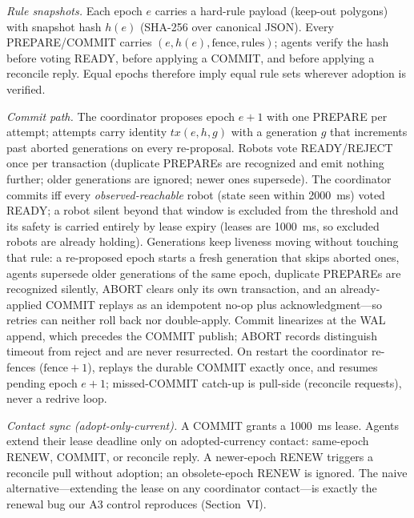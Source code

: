 \documentclass[10pt,journal]{IEEEtran}
\begin{document}
\emph{Rule snapshots.} Each epoch $e$ carries a hard-rule payload
(keep-out polygons) with snapshot hash $h(e)$ (SHA-256 over canonical
JSON). Every PREPARE/COMMIT carries $(e,h(e),\text{fence},\text{rules})$;
agents verify the hash before voting READY, before applying a COMMIT,
and before applying a reconcile reply. Equal epochs therefore imply
equal rule sets wherever adoption is verified.

\emph{Commit path.} The coordinator proposes epoch $e{+}1$ with one
PREPARE per attempt; attempts carry identity
$\mathit{tx}(e,h,g)$ with a generation $g$ that increments past
aborted generations on every re-proposal. Robots vote READY/REJECT
once per transaction (duplicate PREPAREs are recognized and emit
nothing further; older generations are ignored; newer ones supersede).
The coordinator commits iff every \emph{observed-reachable} robot
(state seen within 2000~ms) voted READY; a robot silent beyond that
window is excluded from the threshold and its safety is carried
entirely by lease expiry (leases are 1000~ms, so excluded robots are
already holding). Generations keep liveness moving without touching
that rule: a re-proposed epoch starts a fresh generation that skips
aborted ones, agents supersede older generations of the same epoch,
duplicate PREPAREs are recognized silently, ABORT clears only its own
transaction, and an already-applied COMMIT replays as an idempotent
no-op plus acknowledgment---so retries can neither roll back nor
double-apply. Commit linearizes at the WAL append, which precedes
the COMMIT publish; ABORT records distinguish timeout from reject and
are never resurrected. On restart the coordinator re-fences
($\text{fence}+1$), replays the durable COMMIT exactly once, and
resumes pending epoch $e{+}1$; missed-COMMIT catch-up is pull-side
(reconcile requests), never a redrive loop.

\emph{Contact sync (adopt-only-current).} A COMMIT grants a 1000~ms
lease. Agents extend their lease deadline only on adopted-currency
contact: same-epoch RENEW, COMMIT, or reconcile reply. A newer-epoch
RENEW triggers a reconcile pull without adoption; an obsolete-epoch
RENEW is ignored. The naive alternative---extending the lease on any
coordinator contact---is exactly the renewal bug our A3 control
reproduces (Section~VI).
\end{document}
